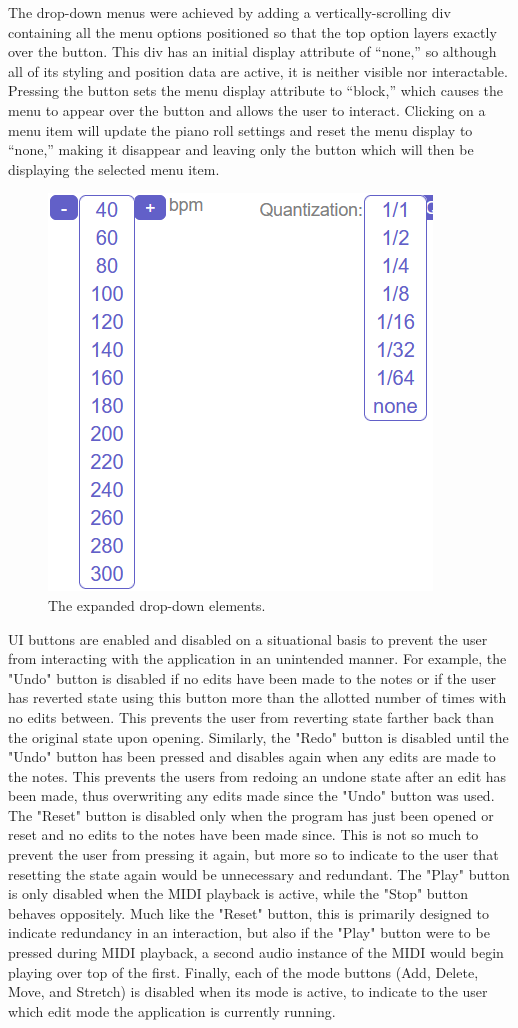 The drop-down menus were achieved by adding a vertically-scrolling div containing all the menu
options positioned so that the top option layers exactly over the button. This div has an initial
display attribute of “none,” so although all of its styling and position data are active, it is
neither visible nor interactable. Pressing the button sets the menu display attribute to “block,”
which causes the menu to appear over the button and allows the user to interact. Clicking on a menu
item will update the piano roll settings and reset the menu display to “none,” making it disappear
and leaving only the button which will then be displaying the selected menu item.

\begin{figure}[h!]
  \centering
  \includegraphics[width=0.4\linewidth]{image/Dropdowns.png}
  \caption{The expanded drop-down elements.}
  \label{fig:dropdowns}
\end{figure}

UI buttons are enabled and disabled on a situational basis to prevent the user from interacting
with the application in an unintended manner. For example, the "Undo" button is disabled if no
edits have been made to the notes or if the user has reverted state using this button more than
the allotted number of times with no edits between. This prevents the user from reverting state
farther back than the original state upon opening. Similarly, the "Redo" button is disabled until
the "Undo" button has been pressed and disables again when any edits are made to the notes. This
prevents the users from redoing an undone state after an edit has been made, thus overwriting any
edits made since the "Undo" button was used. The "Reset" button is disabled only when the program
has just been opened or reset and no edits to the notes have been made since. This is not so much
to prevent the user from pressing it again, but more so to indicate to the user that resetting the
state again would be unnecessary and redundant. The "Play" button is only disabled when
the MIDI playback is active, while the "Stop" button behaves oppositely. Much like the "Reset"
button, this is primarily designed to indicate redundancy in an interaction, but also if the "Play"
button were to be pressed during MIDI playback, a second audio instance of the MIDI would begin
playing over top of the first. Finally, each of the mode buttons (Add, Delete, Move, and Stretch)
is disabled when its mode is active, to indicate to the user which edit mode the application is
currently running.

